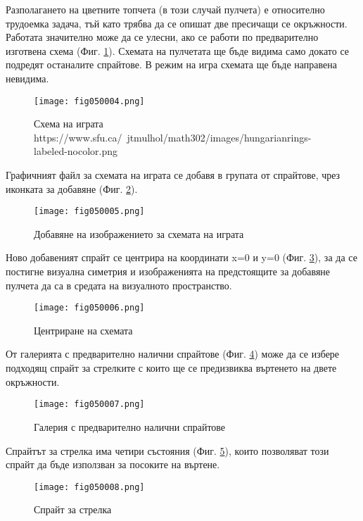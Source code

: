 Разполагането на цветните топчета (в този случай пулчета) е относително трудоемка задача, тъй като трябва да се опишат две пресичащи се окръжности. Работата значително може да се улесни, ако се работи по предварително изготвена схема (Фиг. \ref{fig050004}). Схемата на пулчетата ще бъде видима само докато се подредят останалите спрайтове. В режим на игра схемата ще бъде направена невидима.

\begin{figure}[H]
  \centering
  \texttt{[image: fig050004.png]}
  \caption{Схема на играта \\ https://www.sfu.ca/~jtmulhol/math302/images/hungarianrings-labeled-nocolor.png}
\label{fig050004}
\end{figure}

Графичният файл за схемата на играта се добавя в групата от спрайтове, чрез иконката за добавяне (Фиг. \ref{fig050005}).

\begin{figure}[H]
  \centering
  \texttt{[image: fig050005.png]}
  \caption{Добавяне на изображението за схемата на играта}
\label{fig050005}
\end{figure}

Ново добавеният спрайт се центрира на координати x=0 и y=0 (Фиг. \ref{fig050006}), за да се постигне визуална симетрия и изображенията на предстоящите за добавяне пулчета да са в средата на визуалното пространство. 

\begin{figure}[H]
  \centering
  \texttt{[image: fig050006.png]}
  \caption{Центриране на схемата}
\label{fig050006}
\end{figure}

От галерията с предварително налични спрайтове (Фиг. \ref{fig050007}) може да се избере подходящ спрайт за стрелките с които ще се предизвиква въртенето на двете окръжности.

\begin{figure}[H]
  \centering
  \texttt{[image: fig050007.png]}
  \caption{Галерия с предварително налични спрайтове}
\label{fig050007}
\end{figure}

Спрайтът за стрелка има четири състояния (Фиг. \ref{fig050008}), които позволяват този спрайт да бъде използван за посоките на въртене.

\begin{figure}[H]
  \centering
  \texttt{[image: fig050008.png]}
  \caption{Спрайт за стрелка}
\label{fig050008}
\end{figure}

